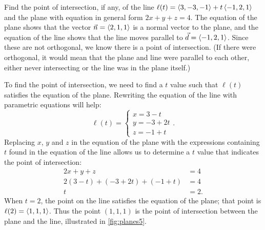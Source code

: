 \begin{example}\label{ex_planes5}%
Find the point of intersection, if any, of the line $\ell(t) =\left\langle 3,-3,-1\right\rangle+t\left\langle -1,2,1\right\rangle$ and the plane with equation in general form $2x+y+z=4$.
\solution
The equation of the plane shows that the vector $\vec n =\left\langle 2,1,1\right\rangle$ is a normal vector to the plane, and the equation of the line shows that the line moves parallel to $\vec d =\left\langle -1,2,1\right\rangle$. Since these are not orthogonal, we know there is a point of intersection. (If there were orthogonal, it would mean that the plane and line were parallel to each other, either never intersecting or the line was in the plane itself.)

To find the point of intersection, we need to find a $t$ value such that $\ell(t)$ satisfies the equation of the plane. Rewriting the equation of the line with parametric equations will help:
\[\ell(t) = \begin{cases}x=3-t\\y=-3+2t\\z=-1+t\end{cases}.\]%
Replacing $x$, $y$ and $z$ in the equation of the plane with the expressions containing $t$ found in the equation of the line allows us to determine a $t$ value that indicates the point of intersection:
\begin{align*}
2x+y+z &=4 \\
2(3-t) + (-3+2t) + (-1+t) &= 4 \\
t&=2.
\end{align*}
When $t=2$, the point on the line satisfies the equation of the plane; that point is $\ell(2) =\left\langle 1,1,1\right\rangle$. Thus the point $(1,1,1)$ is the point of intersection between the plane and the line, illustrated in \autoref{fig:planes5}.
\end{example}

%

\vspace{-\topsep}\vspace{-\partopsep}

